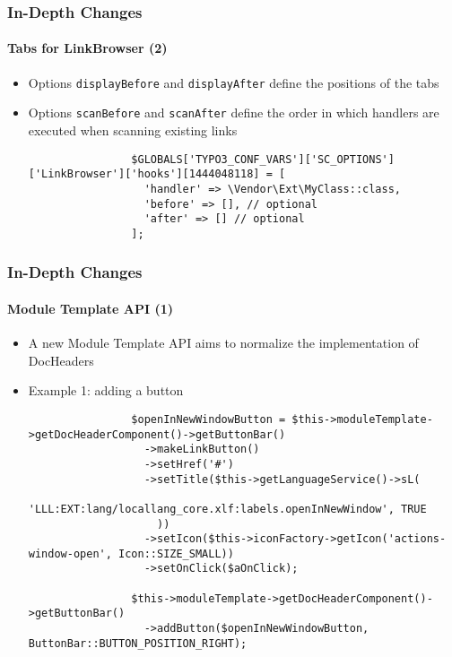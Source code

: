 \begin{frame}[fragile]
	\frametitle{In-Depth Changes}
	\framesubtitle{Tabs for LinkBrowser (2)}

	\lstset{basicstyle=\tiny\ttfamily}

	\begin{itemize}

		\item Options \texttt{displayBefore} and \texttt{displayAfter} define the positions of the tabs

		\item Options \texttt{scanBefore} and \texttt{scanAfter} define the order in which handlers are
			executed when scanning existing links

			\begin{lstlisting}
				$GLOBALS['TYPO3_CONF_VARS']['SC_OPTIONS']['LinkBrowser']['hooks'][1444048118] = [
				  'handler' => \Vendor\Ext\MyClass::class,
				  'before' => [], // optional
				  'after' => [] // optional
				];
			\end{lstlisting}

	\end{itemize}

\end{frame}


\begin{frame}[fragile]
	\frametitle{In-Depth Changes}
	\framesubtitle{Module Template API (1)}

	\lstset{basicstyle=\tiny\ttfamily}

	\begin{itemize}

		\item A new Module Template API aims to normalize the implementation of DocHeaders

		\item Example 1: adding a button

			\begin{lstlisting}
				$openInNewWindowButton = $this->moduleTemplate->getDocHeaderComponent()->getButtonBar()
				  ->makeLinkButton()
				  ->setHref('#')
				  ->setTitle($this->getLanguageService()->sL(
				    'LLL:EXT:lang/locallang_core.xlf:labels.openInNewWindow', TRUE
				    ))
				  ->setIcon($this->iconFactory->getIcon('actions-window-open', Icon::SIZE_SMALL))
				  ->setOnClick($aOnClick);

				$this->moduleTemplate->getDocHeaderComponent()->getButtonBar()
				  ->addButton($openInNewWindowButton, ButtonBar::BUTTON_POSITION_RIGHT);
			\end{lstlisting}
	\end{itemize}

\end{frame}

